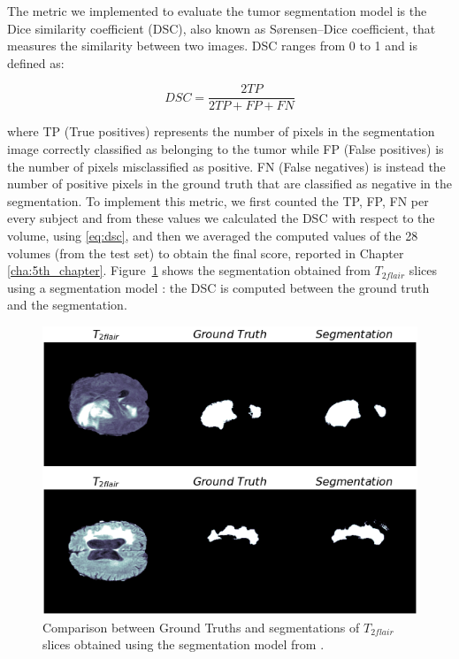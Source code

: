 \vspace{5mm} %
The metric we implemented to evaluate the tumor segmentation model is the Dice similarity coefficient (DSC), also known as Sørensen–Dice coefficient, that measures the similarity between two images. DSC ranges from 0 to 1 and is defined as:

\begin{equation} \label{eq:dsc}
DSC =  \frac{2TP}{2TP + FP + FN}
\end{equation}

where TP (True positives) represents the number of pixels in the segmentation image correctly classified as belonging to the tumor while FP (False positives) is the number of pixels misclassified as positive. FN (False negatives) is instead the number of positive pixels in the ground truth that are classified as negative in the segmentation.
To implement this metric, we first counted the TP, FP, FN per every subject and from these values we calculated the DSC with respect to the volume, using \ref{eq:dsc}, and then we averaged the computed values of the 28 volumes (from the test set) to obtain the final score, reported in Chapter \ref{cha:5th_chapter}. Figure~\ref{fig:segmentation_example} shows the segmentation obtained from $T_{2flair}$ slices using a segmentation model \cite{giacomello2019brain}: the DSC is computed between the ground truth and the segmentation.

\begin{figure}[H]
\centering
\includegraphics[height=0.36\textheight]{images/segmentation_example.pdf}
\caption[Comparison between Ground Truths and Segmentations]{Comparison between Ground Truths and segmentations of $T_{2flair}$ slices obtained using the segmentation model from \cite{giacomello2019brain}.}
\label{fig:segmentation_example}
\end{figure}

